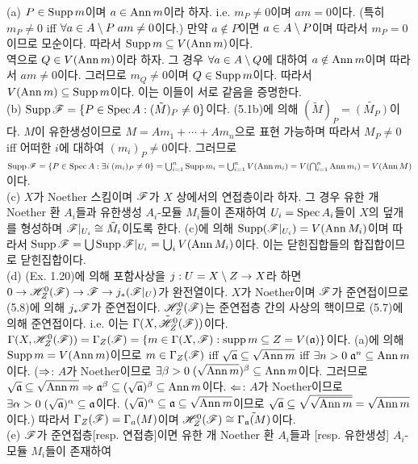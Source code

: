 \begin{enumerate}[label=\tb{5.\arabic*.},itemindent=0mm,itemsep=4mm]
\begin{enumerate}[label=(\alph*)]
	\end{enumerate}
	\sol (a) $P\in\operatorname{Supp} m$이며 $a\in\operatorname{Ann} m$이라 하자. i.e. $m_P\ne 0$이며 $am=0$이다.
	(특히 $m_P\ne 0$ iff $\forall a\in A\setminus P\;am\ne 0$이다.)
	만약 $a\notin P$이면 $a\in A\setminus P$이며 따라서 $m_P=0$이므로 모순이다. 따라서 $\operatorname{Supp} m\subseteq V(\operatorname{Ann} m)$이다.\\
	역으로 $Q\in V(\operatorname{Ann} m)$이라 하자. 그 경우 $\forall a\in A\setminus Q$에 대하여 $a\notin\operatorname{Ann} m$이며 따라서 $am\ne 0$이다.
	그러므로 $m_Q\ne 0$이며 $Q\in\operatorname{Supp} m$이다. 따라서 $V(\operatorname{Ann} m)\subseteq\operatorname{Supp} m$이다. 이는 이들이 서로 같음을 증명한다.\\
	(b) $\operatorname{Supp}\mathscr{F}=\{P\in\operatorname{Spec} A:(\tilde M)_P\ne 0\}$이다. (5.1b)에 의해 $(\tilde M)_P=\tilde{(M_P)}$이다.
	$M$이 유한생성이므로 $M=Am_1+\cdots+Am_n$으로 표현 가능하며 따라서 $M_P\ne 0$ iff 어떠한 $i$에 대하여 $(m_i)_P\ne 0$이다.
	그러므로 $\operatorname{Supp}\mathscr{F}=\{P\in\operatorname{Spec} A:\exists i\;(m_i)_P\ne 0\}=\bigcup_{i=1}^n\operatorname{Supp} m_i=\bigcup_{i=1}^nV(\operatorname{Ann} m_i)
	=V(\bigcap_{i=1}^n\operatorname{Ann} m_i)=V(\operatorname{Ann} M)$이다.\\
	(c) $X$가 Noether 스킴이며 $\mathscr{F}$가 $X$ 상에서의 연접층이라 하자.
	그 경우 유한 개 Noether 환 $A_i$들과 유한생성 $A_i$-모듈 $M_i$들이 존재하여 $U_i=\operatorname{Spec} A_i$들이 $X$의 덮개를 형성하며
	$\mathscr{F}|_{U_i}\cong\tilde M_i$이도록 한다. (c)에 의해 $\operatorname{Supp}(\mathscr{F}|_{U_i})=V(\operatorname{Ann} M_i)$이며
	따라서 $\operatorname{Supp}\mathscr{F}=\bigcup\operatorname{Supp}\mathscr{F}|_{U_i}=\bigcup_iV(\operatorname{Ann} M_i)$이다.
	이는 닫힌집합들의 합집합이므로 닫힌집합이다.\\
	(d) (Ex. 1.20)에 의해 포함사상을 $j:U=X\setminus Z\rightarrow X$라 하면 $0\rightarrow\mathscr{H}^0_Z(\mathscr{F})\rightarrow\mathscr{F}\rightarrow j_*(\mathscr{F}|_U)$가 완전열이다.
	$X$가 Noether이며 $\mathscr{F}$가 준연접이므로 (5.8)에 의해 $j_*\mathscr{F}$가 준연접이다.
	$\mathscr{H}^0_Z(\mathscr{F})$는 준연접층 간의 사상의 핵이므로 (5.7)에 의해 준연접이다. i.e. 이는 $\tilde{\Gamma(X,\mathscr{H}^0_Z(\mathscr{F}))}$이다.
	$\Gamma(X,\mathscr{H}^0_Z(\mathscr{F}))=\Gamma_Z(\mathscr{F})=\{m\in\Gamma(X,\mathscr{F}):\operatorname{supp} m\subseteq Z=V(\mathfrak{a})\}$이다.
	(a)에 의해 $\operatorname{Supp} m=V(\operatorname{Ann} m)$이므로 $m\in\Gamma_Z(\mathscr{F})$ iff $\sqrt{\mathfrak{a}}\subseteq\sqrt{\operatorname{Ann} m}$
	iff $\exists n>0\;\mathfrak{a}^n\subseteq\operatorname{Ann} m$이다.
	($\Rightarrow$: $A$가 Noether이므로 $\exists\beta>0\;(\sqrt{\operatorname{Ann} m})^\beta\subseteq\operatorname{Ann} m$이다.
	그러므로 $\sqrt{\mathfrak{a}}\subseteq\sqrt{\operatorname{Ann} m}\Rightarrow\mathfrak{a}^\beta\subseteq(\sqrt{\mathfrak{a}})^\beta\subseteq\operatorname{Ann} m$이다.
	$\Leftarrow$: $A$가 Noether이므로 $\exists\alpha>0\;(\sqrt{\mathfrak{a}})^\alpha\subseteq\mathfrak{a}$이다.
	$(\sqrt{\mathfrak{a}})^\alpha\subseteq\mathfrak{a}\subseteq\sqrt{\operatorname{Ann} m}$이므로 $\sqrt{\mathfrak{a}}\subseteq\sqrt{\sqrt{\operatorname{Ann} m}}=\sqrt{\operatorname{Ann} m}$이다.)
	따라서 $\Gamma_Z(\mathscr{F})=\Gamma_a(M)$이며 $\mathscr{H}^0_Z(\mathscr{F})\cong\tilde{\Gamma_{\mathfrak{a}}(M)}$이다.\\
	(e) $\mathscr{F}$가 준연접층[resp. 연접층]이면 유한 개 Noether 환 $A_i$들과 [resp. 유한생성] $A_i$-모듈 $M_i$들이 존재하여

\end{enumerate}
